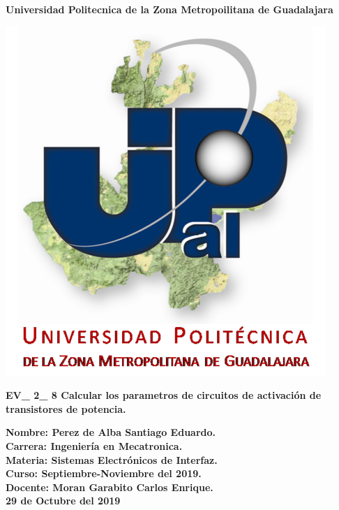 \documentclass[14pt,letterpaper]{article}
\author{Perez de Alba Santiago Eduardo.}
\begin{document}
\begin{center}

\LARGE \textbf{Universidad Politecnica de la Zona Metropoilitana de Guadalajara\\}

\includegraphics[scale=1]{Upzmg.png} 

\large \textbf{EV\_ 2\_ 8 Calcular los parametros de circuitos de activación de transistores de potencia.}

\end{center}

\vspace{1cm}
\large \textbf{Nombre: Perez de Alba Santiago Eduardo.\\
\vspace{0.5cm} Carrera: Ingeniería en Mecatronica.\\
\vspace{0.5cm} Materia: Sistemas Electrónicos de Interfaz.\\
\vspace{0.5cm} Curso: Septiembre-Noviembre del 2019.\\
\vspace{0.5cm} Docente: Moran Garabito Carlos Enrique.}\\
\vspace{0.5cm}
\small \textbf{29 de Octubre del 2019}
\end{document}
